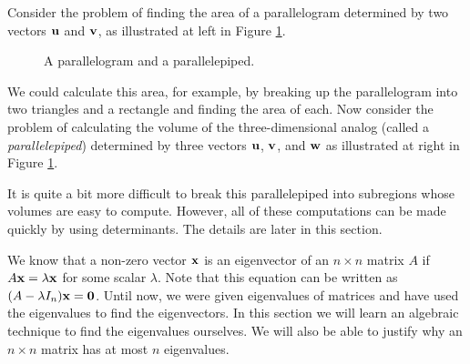  \label{sec:determinants}

\vspace*{-17 pt}

\vspace*{13 pt}


Consider the problem of finding the area of a parallelogram determined by two  vectors $\mathbf{u}$ and $\mathbf{v}$, as illustrated at left in Figure \ref{F:det_area}.
\begin{figure}[ht]
  \begin{center}
 \hspace{0.1in} 
    \caption{A parallelogram and a parallelepiped.}
    \label{F:det_area}
  \end{center}
\end{figure}
We could calculate this area, for example, by breaking up the parallelogram into two triangles and a rectangle and finding the area of each. Now consider the problem of calculating the volume of the three-dimensional analog (called a \emph{parallelepiped}) determined by three vectors $\mathbf{u}$, $\mathbf{v}$, and $\mathbf{w}$ as illustrated at right in Figure \ref{F:det_area}. 

It is quite a bit more difficult to break this parallelepiped into subregions whose volumes are easy to compute. However, all of these computations can be made quickly by using determinants. The details are later in this section. 

We know that a non-zero vector $\mathbf{x}$ is an eigenvector of an $n \times n$ matrix $A$ if $A \mathbf{x} = \lambda \mathbf{x}$ for some scalar $\lambda$. Note that this equation can be written as $(A-\lambda I_n)\mathbf{x}=\mathbf{0}$. Until now, we were given eigenvalues of matrices and have used the eigenvalues to find the eigenvectors. In this section we will learn an algebraic technique to find the eigenvalues ourselves. We will also be able to justify why an $n\times n$ matrix has at most $n$ eigenvalues. 

